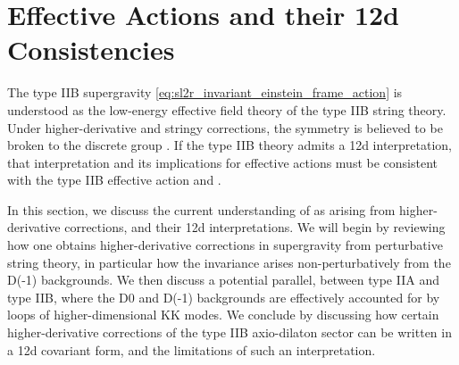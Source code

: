 \section{Effective Actions and their 12d Consistencies}
\label{sec:effective-actions}
The type IIB supergravity \eqref{eq:sl2r_invariant_einstein_frame_action} is understood as the low-energy effective field theory of the type IIB string theory.
Under higher-derivative and stringy corrections, the \SLR{} symmetry is believed to be broken to the discrete group \SLZ{} \cite{Schwarz:1995dk}.
If the type IIB theory admits a 12d interpretation, that interpretation and its implications for effective actions must be consistent with the type IIB effective action and \SLZ{}.

In this section, we discuss the current understanding of \SLZ{} as arising from higher-derivative corrections, and their 12d interpretations.
We will begin by reviewing how one obtains higher-derivative corrections in supergravity from perturbative string theory, in particular how the \SLZ{} invariance arises non-perturbatively from the D(-1) backgrounds.
We then discuss a potential parallel, between type IIA and type IIB, where the D0 and D(-1) backgrounds are effectively accounted for by loops of higher-dimensional KK modes.
We conclude by discussing how certain higher-derivative corrections of the type IIB axio-dilaton sector can be written in a 12d covariant form, and the limitations of such an interpretation.

